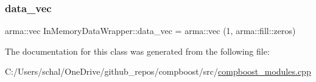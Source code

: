 \mbox{\label{class_in_memory_data_wrapper_a7dc9516de29c977acf3a403d511a49ea}} 
\subsubsection{\texorpdfstring{data\+\_\+vec}{data\_vec}}
{\footnotesize\ttfamily arma\+::vec In\+Memory\+Data\+Wrapper\+::data\+\_\+vec = arma\+::vec (1, arma\+::fill\+::zeros)\hspace{0.3cm}{\ttfamily [private]}}



The documentation for this class was generated from the following file\+:\begin{DoxyCompactItemize}
\item 
C\+:/\+Users/schal/\+One\+Drive/github\+\_\+repos/compboost/src/\mbox{\hyperlink{compboost__modules_8cpp}{compboost\+\_\+modules.\+cpp}}\end{DoxyCompactItemize}
